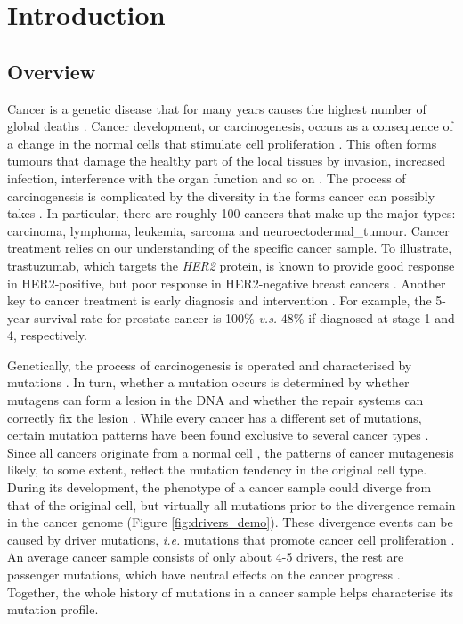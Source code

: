 \chapter{Introduction}\label{intro}

\section{Overview}

Cancer is a genetic disease that for many years causes the highest number of global deaths \citep{Bray2021TheWorldwide}. Cancer development, or carcinogenesis, occurs as a consequence of a change in the normal cells that stimulate cell proliferation \citep{Weinberg1996HowArises}. This often forms tumours that damage the healthy part of the local tissues by invasion, increased infection, interference with the organ function and so on \citep{Tobias2014CancerManagement}. The process of carcinogenesis is complicated by the diversity in the forms cancer can possibly takes \citep{weinberg2013biology}. In particular, there are roughly 100 cancers that make up the major types: \gls{carcinoma}, \gls{lymphoma}, \gls{leukemia}, \gls{sarcoma} and \gls{neuroectodermal_tumour}. Cancer treatment relies on our understanding of the specific cancer sample. To illustrate, trastuzumab, which targets the \textit{HER2} protein, is known to provide good response in HER2-positive, but poor response in HER2-negative breast cancers \citep{Kreutzfeldt2020TheTherapies}. Another key to cancer treatment is early diagnosis and intervention \citep{Hawkes2019CancerDiagnosis}. For example, the 5-year survival rate for prostate cancer is 100\% \textit{v.s.} 48\% if diagnosed at stage 1 and 4, respectively. 

Genetically, the process of \gls{carcinogenesis} is operated and characterised by mutations \citep{Stratton2009}. In turn, whether a mutation occurs is determined by whether mutagens can form a \gls{lesion} in the DNA and whether the repair systems can correctly fix the lesion \citep{Chatterjee2017MechanismsMutagenesis}. While every cancer has a different set of mutations, certain mutation patterns have been found exclusive to several cancer types \citep{Alexandrov2013,Polak2015,Campbell2020}. Since all cancers originate from a normal cell \citep{Hanahan2011HallmarksGeneration}, the patterns of cancer \gls{mutagenesis} likely, to some extent, reflect the mutation tendency in the original cell type. During its development, the phenotype of a cancer sample could diverge from that of the original cell, but virtually all mutations prior to the divergence remain in the cancer genome (Figure \ref{fig:drivers_demo}). These divergence events can be caused by driver mutations, \textit{i.e.} mutations that promote cancer cell proliferation \citep{Pon2015}. An average cancer sample consists of only about 4-5 drivers, the rest are passenger mutations, which have neutral effects on the cancer progress \citep{Campbell2020}. Together, the whole history of mutations in a cancer sample helps characterise its mutation profile. 

